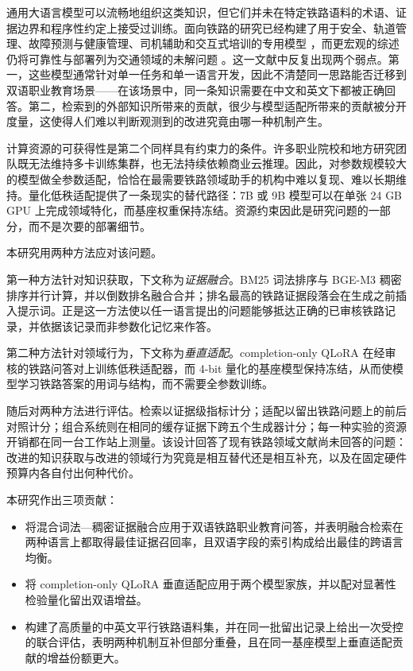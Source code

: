 \documentclass{article}
\begin{document}
通用大语言模型可以流畅地组织这类知识，但它们并未在特定铁路语料的术语、证据边界和程序性约定上接受过训练。面向铁路的研究已经构建了用于安全、轨道管理、故障预测与健康管理、司机辅助和交互式培训的专用模型 \citep{zheng2023trafficsafety,li2024rschat,song2025railway,wang2024phm,luo2025driver,li2025training,huang2026emergency}，而更宏观的综述仍将可靠性与部署列为交通领域的未解问题 \citep{wandelt2024transport}。这一文献中反复出现两个弱点。第一，这些模型通常针对单一任务和单一语言开发，因此不清楚同一思路能否迁移到双语职业教育场景——在该场景中，同一条知识需要在中文和英文下都被正确回答。第二，检索到的外部知识所带来的贡献，很少与模型适配所带来的贡献被分开度量，这使得人们难以判断观测到的改进究竟由哪一种机制产生。

计算资源的可获得性是第二个同样具有约束力的条件。许多职业院校和地方研究团队既无法维持多卡训练集群，也无法持续依赖商业云推理。因此，对参数规模较大的模型做全参数适配，恰恰在最需要铁路领域助手的机构中难以复现、难以长期维持。量化低秩适配提供了一条现实的替代路径：7B 或 9B 模型可以在单张 24 GB GPU 上完成领域特化，而基座权重保持冻结。资源约束因此是研究问题的一部分，而不是次要的部署细节。

本研究用两种方法应对该问题。

第一种方法针对知识获取，下文称为\emph{证据融合}。BM25 词法排序与 BGE-M3 稠密排序并行计算，并以倒数排名融合合并；排名最高的铁路证据段落会在生成之前插入提示词。正是这一方法使以任一语言提出的问题能够抵达正确的已审核铁路记录，并依据该记录而非参数化记忆来作答。

第二种方法针对领域行为，下文称为\emph{垂直适配}。completion-only QLoRA 在经审核的铁路问答对上训练低秩适配器，而 4-bit 量化的基座模型保持冻结，从而使模型学习铁路答案的用词与结构，而不需要全参数训练。

随后对两种方法进行评估。检索以证据级指标计分；适配以留出铁路问题上的前后对照计分；组合系统则在相同的缓存证据下跨五个生成器计分；每一种实验的资源开销都在同一台工作站上测量。该设计回答了现有铁路领域文献尚未回答的问题：改进的知识获取与改进的领域行为究竟是相互替代还是相互补充，以及在固定硬件预算内各自付出何种代价。

本研究作出三项贡献：

\begin{itemize}
\item 将混合词法—稠密证据融合应用于双语铁路职业教育问答，并表明融合检索在两种语言上都取得最佳证据召回率，且双语字段的索引构成给出最佳的跨语言均衡。
\item 将 completion-only QLoRA 垂直适配应用于两个模型家族，并以配对显著性检验量化留出双语增益。
\item 构建了高质量的中英文平行铁路语料集，并在同一批留出记录上给出一次受控的联合评估，表明两种机制互补但部分重叠，且在同一基座模型上垂直适配贡献的增益份额更大。
\end{itemize}
\end{document}
